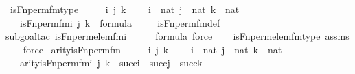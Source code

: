 \begin{isabellebody}
\isanewline
{}\isamarkupfalse%
\ is{\isacharunderscore}{\kern0pt}Fn{\isacharunderscore}{\kern0pt}perm{\isacharunderscore}{\kern0pt}fm{\isacharunderscore}{\kern0pt}type\ {\isacharcolon}{\kern0pt}\ \isanewline
\ \ \ i\ j\ k\ \isanewline
\ \ \ {\isachardoublequoteopen}i\ {\isasymin}\ nat{\isachardoublequoteclose}\ {\isachardoublequoteopen}j\ {\isasymin}\ nat{\isachardoublequoteclose}\ {\isachardoublequoteopen}k\ {\isasymin}\ nat{\isachardoublequoteclose}\ \isanewline
\ \ \ {\isachardoublequoteopen}is{\isacharunderscore}{\kern0pt}Fn{\isacharunderscore}{\kern0pt}perm{\isacharunderscore}{\kern0pt}fm{\isacharparenleft}{\kern0pt}i{\isacharcomma}{\kern0pt}\ j{\isacharcomma}{\kern0pt}\ k{\isacharparenright}{\kern0pt}\ {\isasymin}\ formula{\isachardoublequoteclose}\ \isanewline
%
\isadelimproof
\ \ %
\endisadelimproof
%
\isatagproof
{}\isamarkupfalse%
\ is{\isacharunderscore}{\kern0pt}Fn{\isacharunderscore}{\kern0pt}perm{\isacharunderscore}{\kern0pt}fm{\isacharunderscore}{\kern0pt}def\isanewline
\ \ \isamarkupfalse%
{\isacharparenleft}{\kern0pt}subgoal{\isacharunderscore}{\kern0pt}tac\ {\isachardoublequoteopen}is{\isacharunderscore}{\kern0pt}Fn{\isacharunderscore}{\kern0pt}perm{\isacharunderscore}{\kern0pt}elem{\isacharunderscore}{\kern0pt}fm{\isacharparenleft}{\kern0pt}i\ {\isacharhash}{\kern0pt}{\isacharplus}{\kern0pt}\ {}{\isacharcomma}{\kern0pt}\ {}{\isacharcomma}{\kern0pt}\ {}{\isacharparenright}{\kern0pt}\ {\isasymin}\ formula{\isachardoublequoteclose}{\isacharcomma}{\kern0pt}\ force{\isacharparenright}{\kern0pt}\isanewline
\ \ \isamarkupfalse%
\ is{\isacharunderscore}{\kern0pt}Fn{\isacharunderscore}{\kern0pt}perm{\isacharunderscore}{\kern0pt}elem{\isacharunderscore}{\kern0pt}fm{\isacharunderscore}{\kern0pt}type\ assms\isanewline
\ \ \isamarkupfalse%
\ force%
\endisatagproof
{\isafoldproof}%
%
\isadelimproof
\isanewline
%
\endisadelimproof
\isanewline
{}\isamarkupfalse%
\ arity{\isacharunderscore}{\kern0pt}is{\isacharunderscore}{\kern0pt}Fn{\isacharunderscore}{\kern0pt}perm{\isacharunderscore}{\kern0pt}fm\ {\isacharcolon}{\kern0pt}\ \isanewline
\ \ \ i\ j\ k\ \isanewline
\ \ \ {\isachardoublequoteopen}i\ {\isasymin}\ nat{\isachardoublequoteclose}\ {\isachardoublequoteopen}j\ {\isasymin}\ nat{\isachardoublequoteclose}\ {\isachardoublequoteopen}k\ {\isasymin}\ nat{\isachardoublequoteclose}\ \isanewline
\ \ \ {\isachardoublequoteopen}arity{\isacharparenleft}{\kern0pt}is{\isacharunderscore}{\kern0pt}Fn{\isacharunderscore}{\kern0pt}perm{\isacharunderscore}{\kern0pt}fm{\isacharparenleft}{\kern0pt}i{\isacharcomma}{\kern0pt}\ j{\isacharcomma}{\kern0pt}\ k{\isacharparenright}{\kern0pt}{\isacharparenright}{\kern0pt}\ {\isasymle}\ succ{\isacharparenleft}{\kern0pt}i{\isacharparenright}{\kern0pt}\ {\isasymunion}\ succ{\isacharparenleft}{\kern0pt}j{\isacharparenright}{\kern0pt}\ {\isasymunion}\ succ{\isacharparenleft}{\kern0pt}k{\isacharparenright}{\kern0pt}{\isachardoublequoteclose}\isanewline

\end{isabellebody}
